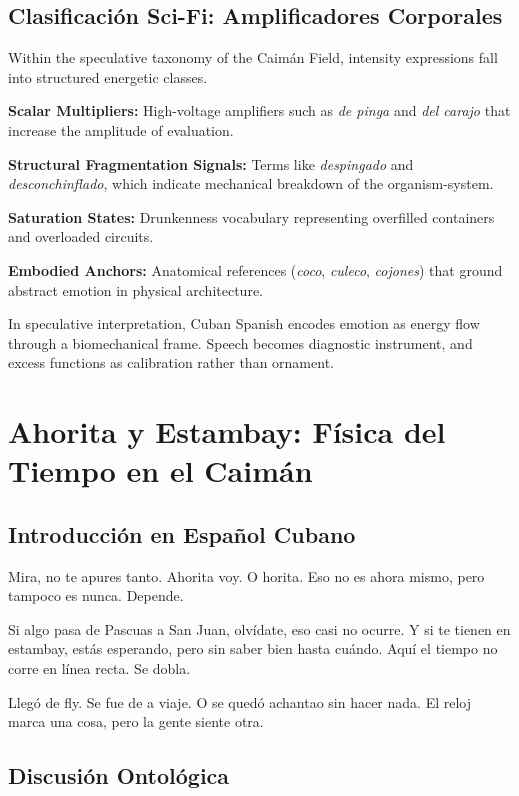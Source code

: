 \documentclass[12pt]{article}
\begin{document}
\subsection*{Clasificación Sci-Fi: Amplificadores Corporales}

Within the speculative taxonomy of the Caimán Field, intensity expressions fall into structured energetic classes.

\textbf{Scalar Multipliers:} High-voltage amplifiers such as \textit{de pinga} and \textit{del carajo} that increase the amplitude of evaluation.

\textbf{Structural Fragmentation Signals:} Terms like \textit{despingado} and \textit{desconchinflado}, which indicate mechanical breakdown of the organism-system.

\textbf{Saturation States:} Drunkenness vocabulary representing overfilled containers and overloaded circuits.

\textbf{Embodied Anchors:} Anatomical references (\textit{coco}, \textit{culeco}, \textit{cojones}) that ground abstract emotion in physical architecture.

In speculative interpretation, Cuban Spanish encodes emotion as energy flow through a biomechanical frame. Speech becomes diagnostic instrument, and excess functions as calibration rather than ornament.

\section{Ahorita y Estambay: Física del Tiempo en el Caimán}

\subsection*{Introducción en Español Cubano}

Mira, no te apures tanto. Ahorita voy. O horita. Eso no es ahora mismo, pero tampoco es nunca. Depende.

Si algo pasa de Pascuas a San Juan, olvídate, eso casi no ocurre. Y si te tienen en estambay, estás esperando, pero sin saber bien hasta cuándo. Aquí el tiempo no corre en línea recta. Se dobla.

Llegó de fly. Se fue de a viaje. O se quedó achantao sin hacer nada. El reloj marca una cosa, pero la gente siente otra.

\subsection*{Discusión Ontológica}
\end{document}
